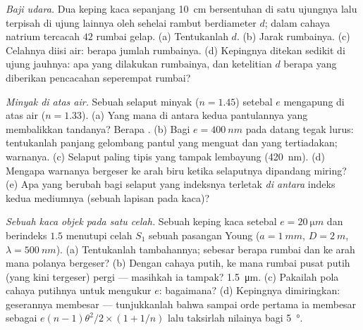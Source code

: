 \begin{exercise}[$\star\star$]\label{exo:b2:two-wave-interference:8}
\emph{Baji udara.} Dua keping kaca sepanjang \qty{10}{cm} bersentuhan di satu ujungnya lalu
terpisah di ujung lainnya oleh sehelai rambut berdiameter $d$; dalam cahaya natrium
tercacah $42$ rumbai gelap. (a) Tentukanlah $d$. (b) Jarak rumbainya. (c) Celahnya
diisi air: berapa jumlah rumbainya. (d) Kepingnya ditekan
sedikit di ujung jauhnya: apa yang dilakukan rumbainya, dan ketelitian $d$ berapa
yang diberikan pencacahan seperempat rumbai?
\end{exercise}

\begin{exercise}[$\star\star$]\label{exo:b2:two-wave-interference:9}
\emph{Minyak di atas air.} Sebuah selaput minyak ($n = 1.45$) setebal $e$ mengapung
di atas air ($n = 1.33$). (a) Yang mana di antara kedua pantulannya yang membalikkan
tandanya? Berapa . (b) Bagi $e = \qty{400}{nm}$ pada datang tegak lurus:
tentukanlah panjang gelombang pantul yang menguat dan yang tertiadakan; warnanya. (c) Selaput
paling tipis yang tampak lembayung (\qty{420}{nm}). (d) Mengapa warnanya bergeser ke arah
biru ketika selaputnya dipandang miring? (e) Apa yang berubah bagi selaput
yang indeksnya terletak \emph{di antara} indeks kedua mediumnya (sebuah lapisan pada
kaca)?
\end{exercise}

\begin{exercise}[$\star\star\star$]\label{exo:b2:two-wave-interference:10}
\emph{Sebuah kaca objek pada satu celah.} Sebuah keping kaca setebal $e = \qty{20}{\micro m}$
dan berindeks $1.5$ menutupi celah $S_1$ sebuah pasangan Young ($a = \qty{1}{mm}$, $D =
\qty{2}{m}$, $\lambda = \qty{500}{nm}$). (a) Tentukanlah  tambahannya; sebesar berapa rumbai
dan ke arah mana polanya bergeser? (b) Dengan cahaya putih,
ke mana rumbai pusat putih (yang kini tergeser) pergi --- masihkah ia
tampak?  \qty{1.5}{\micro m}. (c) Pakailah pola cahaya putihnya
untuk mengukur $e$: bagaimana? (d) Kepingnya dimiringkan: geserannya membesar
--- tunjukkanlah bahwa sampai orde pertama ia membesar sebagai $e(n - 1)\theta^2/2 \times (1 + 1/n)$
lalu taksirlah nilainya bagi \qty{5}{\degree}.
\end{exercise}

